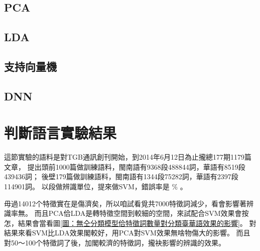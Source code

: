 \documentclass[final,oneside,onecolumn,12pt,a4paper]{book}%
\begin{document}
\subsection{PCA}
\label{節：PCA}

\subsection{LDA}
\label{節：LDA}

\subsection{支持向量機}
\label{節：支持向量機}

\subsection{DNN}
\label{節：DNN}


\section{判斷語言實驗結果}
\label{節：判斷語言實驗結果}
這節實驗的語料是對TGB通訊創刊開始，到2014年6月12日為止攏總177期1179篇文章，
提出頭前1000篇做訓練語料，閩南語有9368段488844詞，華語有8519段439436詞；
後壁179篇做訓練語料，閩南語有1344段75282詞，華語有2397段114901詞。
以段做辨識單位，提來做SVM，錯誤率是 $\%$ 。

毋過14012个特徵實在是傷濟矣，所以咱試看覓共7000特徵詞減少，看會影響著辨識率無。
而且PCA佮LDA是轉特徵空間到較細的空間，來試配合SVM效果會按怎，結果會當看圖\ref{圖：無仝分類模型佮特徵詞數量對分類臺華語效果的影響}。
對結果來看SVM比LDA效果閣較好，用PCA對SVM效果無啥物傷大的影響。
而且對50～100个特徵詞了後，加閣較濟的特徵詞，攏袂影響的辨識的效果。
\end{document}
